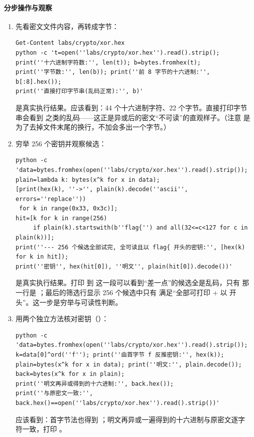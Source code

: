 \documentclass[UTF8,12pt,oneside]{ctexbook}
\begin{document}
\paragraph{分步操作与观察}
\begin{enumerate}[label=\arabic*.]
\item 先看密文文件内容，再转成字节：
\begin{lstlisting}
Get-Content labs/crypto/xor.hex
python -c 't=open(''labs/crypto/xor.hex'').read().strip();
print(''十六进制字符数:'', len(t)); b=bytes.fromhex(t);
print(''字节数:'', len(b)); print(''前 8 字节的十六进制:'', b[:8].hex());
print(''直接打印字节串(乱码正常):'', b)'
\end{lstlisting}
 是真实执行结果。应该看到：44 个十六进制字符、22 个字节。直接打印字节串会看到 \code{Q[VPLOXEh\textasciicircum DYXChZVP\textasciicircum TJ} 之类的乱码——这正是异或后的密文“不可读”的直观样子。（注意  是为了去掉文件末尾的换行，不加会多出一个字节。）
\item 穷举 256 个密钥并观察候选：
\begin{lstlisting}
python -c 'data=bytes.fromhex(open(''labs/crypto/xor.hex'').read().strip());
plain=lambda k: bytes(x^k for x in data);
[print(hex(k), ''->'', plain(k).decode(''ascii'', errors=''replace''))
 for k in range(0x33, 0x3c)];
hit=[k for k in range(256)
     if plain(k).startswith(b''flag{'') and all(32<=c<127 for c in plain(k))];
print(''--- 256 个候选全部试完, 全可读且以 flag{ 开头的密钥:'', [hex(k) for k in hit]);
print(''密钥'', hex(hit[0]), ''明文'', plain(hit[0]).decode())'
\end{lstlisting}
 是真实执行结果。打印  到  这一段可以看到“差一点”的候选全是乱码，只有  那一行是 ；最后的筛选行显示 256 个候选中只有  满足“全部可打印 + 以  开头”。这一步是穷举与可读性判断。
\item 用两个独立方法核对密钥（）：
\begin{lstlisting}
python -c 'data=bytes.fromhex(open(''labs/crypto/xor.hex'').read().strip());
k=data[0]^ord(''f''); print(''由首字节 f 反推密钥:'', hex(k));
plain=bytes(x^k for x in data); print(''明文:'', plain.decode());
back=bytes(x^k for x in plain);
print(''明文再异或得到的十六进制:'', back.hex());
print(''与原密文一致:'', back.hex()==open(''labs/crypto/xor.hex'').read().strip())'
\end{lstlisting}
应该看到：首字节法也得到 ；明文再异或一遍得到的十六进制与原密文逐字符一致，打印 。
\end{enumerate}
\end{document}
